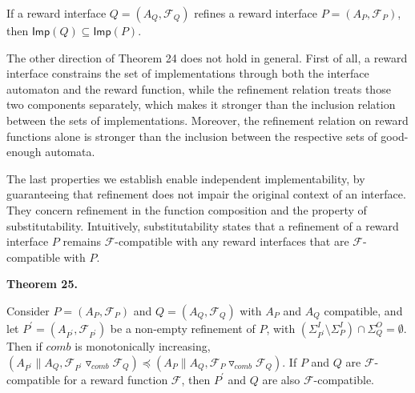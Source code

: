 \documentclass[10pt,a4paper]{article}
\begin{document}
 
If a reward interface $Q=(A_{Q},\mathcal{F}_{Q})$ refines a reward interface $P=(A_{P},\mathcal{F}_{P})$, then $\mathsf{Imp}(Q)\subseteq\mathsf{Imp}(P)$.\par
 
 
 
 
The other direction of Theorem 24 does not hold in general. First of all, a reward interface constrains the set of implementations through both the interface automaton and the reward function, while the refinement relation treats those two components separately, which makes it stronger than the inclusion relation between the sets of implementations. Moreover, the refinement relation on reward functions alone is stronger than the inclusion between the respective sets of good-enough automata.\par
 
 
 
The last properties we establish enable independent implementability, by guaranteeing that refinement does not impair the original context of an interface. They concern refinement in the function composition and the property of substitutability. Intuitively, substitutability states that a refinement of a reward interface $P$ remains $\mathcal{F}$-compatible with any reward interfaces that are $\mathcal{F}$-compatible with $P$.\par
 
 

 
\par\medskip\noindent\textbf{Theorem 25.}\par
 
 
Consider $P=(A_{P},\mathcal{F}_{P})$ and $Q=(A_{Q},\mathcal{F}_{Q})$ with $A_{P}$ and $A_{Q}$ compatible, and let $P^{\prime}=(A_{P^{\prime}},\mathcal{F}_{P^{\prime}})$ be a non-empty refinement of $P$, with $(\Sigma_{P^{\prime}}^{I}\setminus\Sigma_{P}^{I})\cap\Sigma_{Q}^{O}=\emptyset$. Then if $\mathit{comb}$ is monotonically increasing, $(A_{P^{\prime}}\parallel A_{Q},{{\mathcal{F}_{P^{\prime}}}\mathbin{\triangledown_{\mathit{comb}}}{\mathcal{F}_{Q}}})\preceq(A_{P}\parallel A_{Q},{{\mathcal{F}_{P}}\mathbin{\triangledown_{\mathit{comb}}}{\mathcal{F}_{Q}}})$. If $P$ and $Q$ are $\mathcal{F}$-compatible for a reward function $\mathcal{F}$, then $P^{\prime}$ and $Q$ are also $\mathcal{F}$-compatible.\par
 
\end{document}

